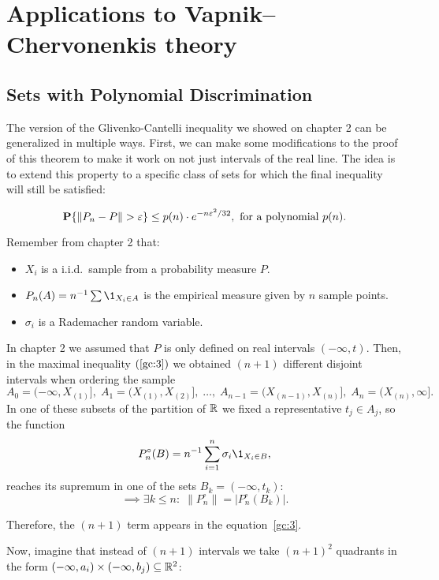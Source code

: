 \chapter{Applications to Vapnik–Chervonenkis theory}

\section{Sets with Polynomial Discrimination}

The version of the Glivenko-Cantelli inequality we showed on chapter 2 can be generalized in multiple ways. First, we can make some modifications to the proof of this theorem to make it work on not just intervals of the real line. The idea is to extend this property to a specific class of sets for which the final inequality will still be satisfied:

\begin{equation}
    \label{vc:1}
    \P\{\|P_n-P\| > \varepsilon\} \leq p(n) \cdot e^{-n \varepsilon^2 / 32}, \text{ for a polynomial } p(n).
\end{equation}

Remember from chapter 2 that:
\begin{itemize}
    \item $X_i$ is a i.i.d.~sample from a probability measure $P$.
    \item $P_n(A) = n^{-1}\sum \1_{X_i \in A} $ is the empirical measure given by $n$ sample points. 
    \item $\sigma_i$ is a Rademacher random variable.
\end{itemize}

In chapter 2 we assumed that $P$ is only defined on real intervals $(-\infty, t)$. Then, in the maximal inequality $(\ref{gc:3})$ we obtained $(n+1)$ different disjoint intervals when ordering the sample
\[A_0 = (-\infty, X_{(1)}],\; A_1 = (X_{(1)}, X_{(2)}],\; \ldots,\; A_{n-1} = (X_{(n-1)}, X_{(n)}],\; A_n = (X_{(n)}, \infty].  \] %
In one of these subsets of the partition of $\mathbb{R}$ we fixed a representative $t_j \in A_j$, so the function
\[ P_n^{\circ}(B) = n^{-1} \sum_{i = 1}^n \sigma_i \1_{X_i \in B}, \] 
reaches its supremum in one of the sets $B_k = (-\infty, t_k)$:
\[ \implies \exists k\leq n :\; \|P_n^\circ\| = |P_n^\circ(B_k)|.  \] 

Therefore, the $(n+1)$ term appears in the equation~\ref{gc:3}.

\vspace*{2em}

Now, imagine that instead of $(n+1)$ intervals we take ${(n+1)}^2$ quadrants in the form $(-\infty, a_i) \times (-\infty, b_j) \subseteq \mathbb{R}^2$:

